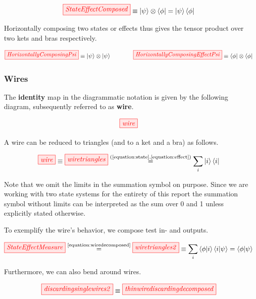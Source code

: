 \documentclass[]{article}
\newcommand{\equaltext}[1]{\ensuremath{\stackrel{\text{#1}}{=}}}
\begin{document}
\begin{equation}
	\tikzfig{StateEffectComposed} \equiv \ket{\psi}\otimes\bra{\phi} = \ket{\psi}\bra{\phi}
\end{equation}

Horizontally composing two states or effects thus gives the tensor product over two kets and bras respectively.

\begin{equation}
	\tikzfig{HorizontallyComposingPsi} \equiv \ket{\psi} \otimes \ket{\psi} ~~~~~~~~~~~ \tikzfig{HorizontallyComposingEffectPsi} \equiv \bra{\phi} \otimes \bra{\phi}
\end{equation}

\subsubsection{Wires}
\label{identity}
The \textbf{identity} map in the diagrammatic notation is given by the following diagram, subsequently referred to as \textbf{wire}.

\begin{equation}
\tikzfig{wire}
\end{equation}

A wire can be reduced to triangles (and to a ket and a bra) as follows.

\begin{equation}
\label{equation:wiredecomposed}
\tikzfig{wire} \equiv \tikzfig{wiretriangles} \equaltext{(\ref{equation:state},\ref{equation:effect})} \sum_{i}\ket{i}\bra{i}
\end{equation}

Note that we omit the limits in the summation symbol on purpose. Since we are working with two state systems for the entirety of this report the summation symbol without limits can be interpreted as the sum over 0 and 1 unless explicitly stated otherwise. 

To exemplify the wire's behavior, we compose test in- and outputs.

\begin{equation}
\label{equation:measure}
\tikzfig{StateEffectMeasure} \equaltext{\ref{equation:wiredecomposed}}  \tikzfig{wiretriangles2} \equiv \sum_{i}\bra{\phi}\ket{i}\bra{i}\ket{\psi} = \bra{\phi}\ket{\psi}
\end{equation}

Furthermore, we can also bend around wires.

\begin{equation}
\label{equation:bentaroundwire}
\tikzfig{discardingsinglewires2} \equiv
\tikzfig{thinwirediscardingdecomposed} 
\end{equation}
\end{document}
